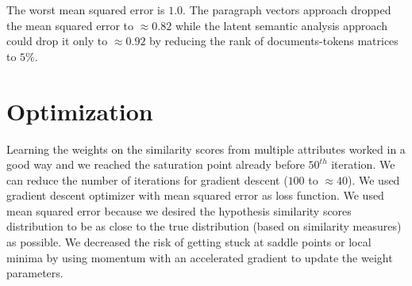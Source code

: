 The worst mean squared error is $1.0$. The paragraph vectors approach dropped the mean squared error to $\approx0.82$ while the latent semantic analysis approach could drop it only to $\approx0.92$ by reducing the rank of documents-tokens matrices to $5\%$.

\section{Optimization}
Learning the weights on the similarity scores from multiple attributes worked in a good way and we reached the saturation point already before $50^{th}$ iteration. We can reduce the number of iterations for gradient descent ($100$ to $\approx40$). We used gradient descent optimizer with mean squared error as loss function. We used mean squared error because we desired the hypothesis similarity scores distribution to be as close to the true distribution (based on similarity measures) as possible. We decreased the risk of getting stuck at saddle points or local minima by using momentum with an accelerated gradient to update the weight parameters.